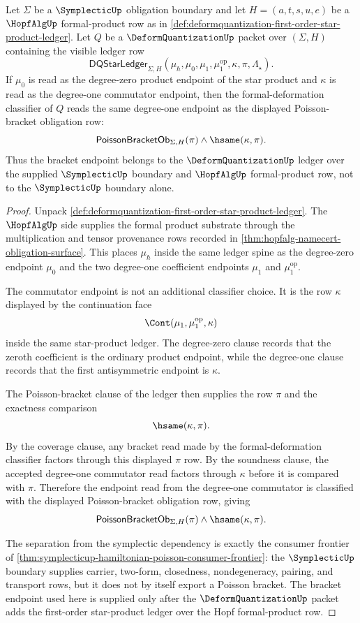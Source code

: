\begin{theorem}
\label{thm:deformquantization-first-order-bracket-ledger}
Let $\Sigma$ be a $\SymplecticUp$ obligation boundary and let $H=(a,t,s,u,e)$ be a $\HopfAlgUp$ formal-product row as in \autoref{def:deformquantization-first-order-star-product-ledger}. Let $Q$ be a $\DeformQuantizationUp$ packet over $(\Sigma,H)$ containing the visible ledger row
$$
\mathsf{DQStarLedger}_{\Sigma,H}(\mu_\hbar,\mu_0,\mu_1,\mu_1^{\mathrm{op}},\kappa,\pi,\Lambda_\star).
$$
If $\mu_0$ is read as the degree-zero product endpoint of the star product and $\kappa$ is read as the degree-one commutator endpoint, then the formal-deformation classifier of $Q$ reads the same degree-one endpoint as the displayed Poisson-bracket obligation row:
$$
\mathsf{PoissonBracketOb}_{\Sigma,H}(\pi)\land\hsame(\kappa,\pi).
$$
Thus the bracket endpoint belongs to the $\DeformQuantizationUp$ ledger over the supplied $\SymplecticUp$ boundary and $\HopfAlgUp$ formal-product row, not to the $\SymplecticUp$ boundary alone.
\end{theorem}
\begin{proof}
Unpack \autoref{def:deformquantization-first-order-star-product-ledger}. The $\HopfAlgUp$ side supplies the formal product substrate through the multiplication and tensor provenance rows recorded in \autoref{thm:hopfalg-namecert-obligation-surface}. This places $\mu_\hbar$ inside the same ledger spine as the degree-zero endpoint $\mu_0$ and the two degree-one coefficient endpoints $\mu_1$ and $\mu_1^{\mathrm{op}}$.

The commutator endpoint is not an additional classifier choice. It is the row $\kappa$ displayed by the continuation face
$$
\Cont(\mu_1,\mu_1^{\mathrm{op}},\kappa)
$$
inside the same star-product ledger. The degree-zero clause records that the zeroth coefficient is the ordinary product endpoint, while the degree-one clause records that the first antisymmetric endpoint is $\kappa$.

The Poisson-bracket clause of the ledger then supplies the row $\pi$ and the exactness comparison
$$
\hsame(\kappa,\pi).
$$
By the coverage clause, any bracket read made by the formal-deformation classifier factors through this displayed $\pi$ row. By the soundness clause, the accepted degree-one commutator read factors through $\kappa$ before it is compared with $\pi$. Therefore the endpoint read from the degree-one commutator is classified with the displayed Poisson-bracket obligation row, giving
$$
\mathsf{PoissonBracketOb}_{\Sigma,H}(\pi)\land\hsame(\kappa,\pi).
$$

The separation from the symplectic dependency is exactly the consumer frontier of \autoref{thm:symplecticup-hamiltonian-poisson-consumer-frontier}: the $\SymplecticUp$ boundary supplies carrier, two-form, closedness, nondegeneracy, pairing, and transport rows, but it does not by itself export a Poisson bracket. The bracket endpoint used here is supplied only after the $\DeformQuantizationUp$ packet adds the first-order star-product ledger over the Hopf formal-product row.
\end{proof}

